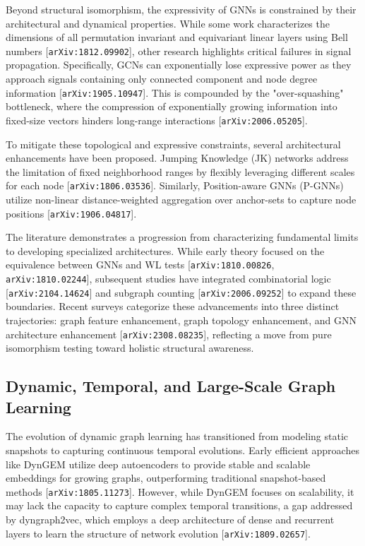 \documentclass[11pt]{article}
\begin{document}
Beyond structural isomorphism, the expressivity of GNNs is constrained by their architectural and dynamical properties. While some work characterizes the dimensions of all permutation invariant and equivariant linear layers using Bell numbers [\texttt{arXiv:1812.09902}], other research highlights critical failures in signal propagation. Specifically, GCNs can exponentially lose expressive power as they approach signals containing only connected component and node degree information [\texttt{arXiv:1905.10947}]. This is compounded by the "over-squashing" bottleneck, where the compression of exponentially growing information into fixed-size vectors hinders long-range interactions [\texttt{arXiv:2006.05205}].

To mitigate these topological and expressive constraints, several architectural enhancements have been proposed. Jumping Knowledge (JK) networks address the limitation of fixed neighborhood ranges by flexibly leveraging different scales for each node [\texttt{arXiv:1806.03536}]. Similarly, Position-aware GNNs (P-GNNs) utilize non-linear distance-weighted aggregation over anchor-sets to capture node positions [\texttt{arXiv:1906.04817}].

The literature demonstrates a progression from characterizing fundamental limits to developing specialized architectures. While early theory focused on the equivalence between GNNs and WL tests [\texttt{arXiv:1810.00826}, \texttt{arXiv:1810.02244}], subsequent studies have integrated combinatorial logic [\texttt{arXiv:2104.14624}] and subgraph counting [\texttt{arXiv:2006.09252}] to expand these boundaries. Recent surveys categorize these advancements into three distinct trajectories: graph feature enhancement, graph topology enhancement, and GNN architecture enhancement [\texttt{arXiv:2308.08235}], reflecting a move from pure isomorphism testing toward holistic structural awareness.

\subsection{Dynamic, Temporal, and Large-Scale Graph Learning}

The evolution of dynamic graph learning has transitioned from modeling static snapshots to capturing continuous temporal evolutions. Early efficient approaches like DynGEM utilize deep autoencoders to provide stable and scalable embeddings for growing graphs, outperforming traditional snapshot-based methods [\texttt{arXiv:1805.11273}]. However, while DynGEM focuses on scalability, it may lack the capacity to capture complex temporal transitions, a gap addressed by dyngraph2vec, which employs a deep architecture of dense and recurrent layers to learn the structure of network evolution [\texttt{arXiv:1809.02657}].
\end{document}
